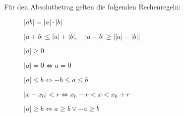 Für den Absolutbetrag gelten die folgenden Rechenregeln:
\begin{description}
    \item[] $|ab| = |a| \cdot |b|$
    \item[] $|a+b| \leq |a| + |b|, \quad |a-b| \geq \big||a| - |b|\big|$
    \item[] $|a| \geq 0$
    \item[] $|a| = 0 \Longleftrightarrow a = 0$
    \item[] $|a| \leq b \Longleftrightarrow -b \leq a \leq b$
    \item[] $|x-x_0| < r \Longleftrightarrow x_0 - r < x < x_0 + r$
    \item[] $|a| \geq b \Longleftrightarrow a \geq b \lor -a \geq b$
\end{description}